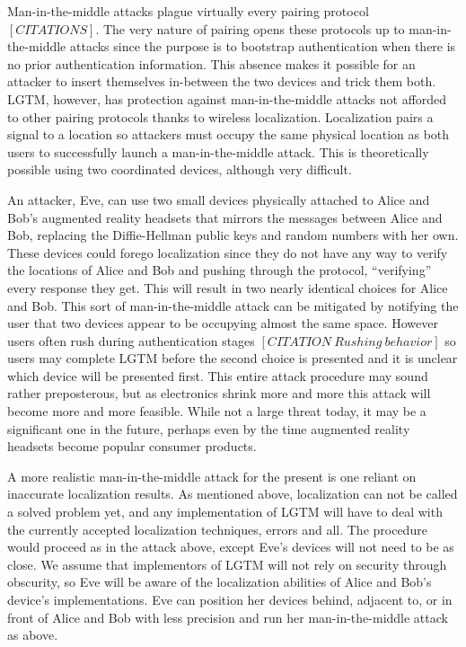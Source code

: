 \documentclass[12pt]{report}
\begin{document}
Man-in-the-middle attacks plague virtually every pairing protocol $[CITATIONS]$. The very nature of pairing opens these protocols up to man-in-the-middle attacks since the purpose is to bootstrap authentication when there is no prior authentication information. This absence makes it possible for an attacker to insert themselves in-between the two devices and trick them both. LGTM, however, has protection against man-in-the-middle attacks not afforded to other pairing protocols thanks to wireless localization. Localization pairs a signal to a location so attackers must occupy the same physical location as both users to successfully launch a man-in-the-middle attack. This is theoretically possible using two coordinated devices, although very difficult. \par

An attacker, Eve, can use two small devices physically attached to Alice and Bob's augmented reality headsets that mirrors the messages between Alice and Bob, replacing the Diffie-Hellman public keys and random numbers with her own. These devices could forego localization since they do not have any way to verify the locations of Alice and Bob and pushing through the protocol, ``verifying'' every response they get. This will result in two nearly identical choices for Alice and Bob. This sort of man-in-the-middle attack can be mitigated by notifying the user that two devices appear to be occupying almost the same space. However users often rush during authentication stages $[CITATION \: Rushing \: behavior]$ so users may complete LGTM before the second choice is presented and it is unclear which device will be presented first. This entire attack procedure may sound rather preposterous, but as electronics shrink more and more this attack will become more and more feasible. While not a large threat today, it may be a significant one in the future, perhaps even by the time augmented reality headsets become popular consumer products. \par

A more realistic man-in-the-middle attack for the present is one reliant on inaccurate localization results. As mentioned above, localization can not be called a solved problem yet, and any implementation of LGTM will have to deal with the currently accepted localization techniques, errors and all. The procedure would proceed as in the attack above, except Eve's devices will not need to be as close. We assume that implementors of LGTM will not rely on security through obscurity, so Eve will be aware of the localization abilities of Alice and Bob's device's implementations. Eve can position her devices behind, adjacent to, or in front of Alice and Bob with less precision and run her man-in-the-middle attack as above. \par
\end{document}
